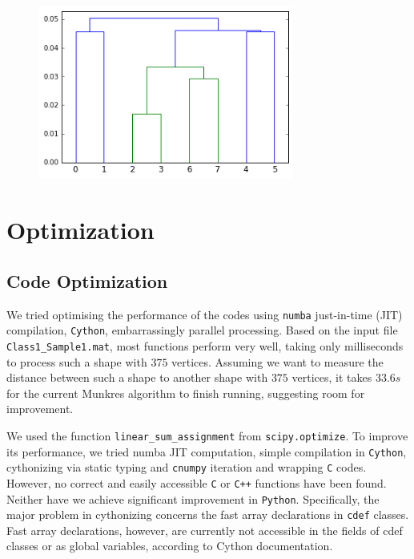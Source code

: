 \documentclass[codesnippet]{jss}
\begin{document}
\begin{figure}
\centering
\includegraphics[width = 0.75\textwidth]{../real_dendogram.png}
\caption{\label{dendogram}}
\end{figure}

\section[optimization]{Optimization}
\subsection{Code Optimization}
We tried optimising the performance of the codes using \texttt{numba} just-in-time (JIT) compilation, \texttt{Cython}, embarrassingly parallel processing. Based on the input file \texttt{Class1\_Sample1.mat}, most functions perform very well, taking only milliseconds to process such a shape with $375$ vertices. Assuming we want to measure the distance between such a shape to another shape with $375$ vertices, it takes $33.6s$ for the current Munkres algorithm to finish running, suggesting room for improvement.

We used the function \texttt{linear\_sum\_assignment}  from \texttt{scipy.optimize}. To improve its performance, we tried numba JIT computation, simple compilation in \texttt{Cython}, cythonizing via static typing and \texttt{cnumpy} iteration and wrapping \texttt{C} codes. However, no correct and easily accessible \texttt{C} or \texttt{C++} functions have been found. Neither have we achieve significant improvement in \texttt{Python}. Specifically, the major problem in cythonizing concerns the fast array declarations in \texttt{cdef} classes. Fast array declarations, however, are currently not accessible in the fields of cdef classes or as global variables, according to Cython documentation.
\end{document}
